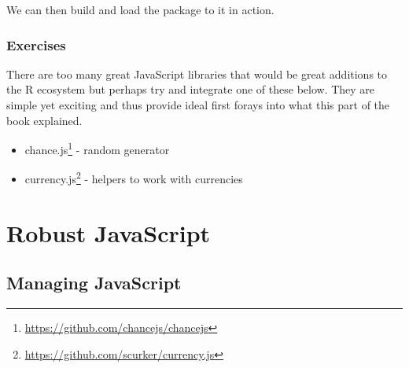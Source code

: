\documentclass[10pt,]{krantz}
\makeatletter
\newenvironment{Shaded}{\begin{snugshade}}{\end{snugshade}}
\newcommand{\CommentTok}[1]{\textcolor[rgb]{0.37,0.37,0.37}{\textit{#1}}}
\newcommand{\DecValTok}[1]{\textcolor[rgb]{0.06,0.06,0.06}{#1}}
\newcommand{\KeywordTok}[1]{\textcolor[rgb]{0.27,0.27,0.27}{\textbf{#1}}}
\newcommand{\NormalTok}[1]{#1}
\newcommand{\OperatorTok}[1]{\textcolor[rgb]{0.43,0.43,0.43}{\textbf{#1}}}
\newcommand{\StringTok}[1]{\textcolor[rgb]{0.5,0.5,0.5}{#1}}
\providecommand{\tightlist}{%
  \setlength{\itemsep}{0pt}\setlength{\parskip}{0pt}}
\renewcommand{\href}[2]{#2\footnote{\url{#1}}}
\newenvironment{kframe}{%
\medskip{}
\setlength{\fboxsep}{.8em}
 \def\at@end@of@kframe{}%
 \ifinner\ifhmode%
  \def\at@end@of@kframe{\end{minipage}}%
  \begin{minipage}{\columnwidth}%
 \fi\fi%
 \def\FrameCommand##1{\hskip\@totalleftmargin \hskip-\fboxsep
 \colorbox{shadecolor}{##1}\hskip-\fboxsep
     \hskip-\linewidth \hskip-\@totalleftmargin \hskip\columnwidth}%
 \MakeFramed {\advance\hsize-\width
   \@totalleftmargin\z@ \linewidth\hsize
   \@setminipage}}%
 {\par\unskip\endMakeFramed%
 \at@end@of@kframe}
\renewenvironment{Shaded}{\begin{kframe}}{\end{kframe}}
\makeatother
\begin{document}
We can then build and load the package to it in action.

\begin{Shaded}
\end{Shaded}

\hypertarget{v8-ml-exercises}{%
\section{Exercises}\label{v8-ml-exercises}}

There are too many great JavaScript libraries that would be great additions to the R ecosystem but perhaps try and integrate one of these below. They are simple yet exciting and thus provide ideal first forays into what this part of the book explained.

\begin{itemize}
\tightlist
\item
  \href{https://github.com/chancejs/chancejs}{chance.js} - random generator
\item
  \href{https://github.com/scurker/currency.js}{currency.js} - helpers to work with currencies
\end{itemize}

\hypertarget{part-robust-javascript}{%
\part{Robust JavaScript}\label{part-robust-javascript}}

\hypertarget{webpack-intro}{%
\chapter{Managing JavaScript}\label{webpack-intro}}
\end{document}

